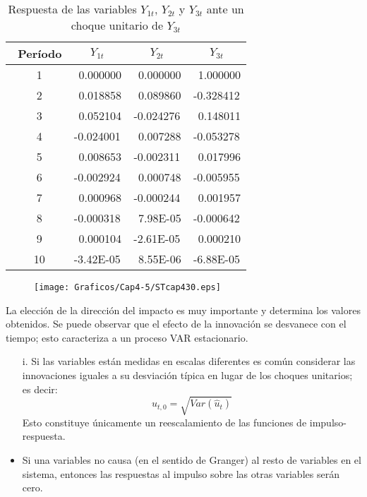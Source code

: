 \begin{table}[H]
\centering
\begin{tabular}{cccc}\hline\hline
~Per\'{i}odo & $Y_{1t}$ & $Y_{2t}$ & $Y_{3t}$ \\ \hline\hline
~1 & ~0.000000 & ~0.000000 & ~1.000000 \\
~2 & ~0.018858 & ~0.089860 & -0.328412 \\
~3 & ~0.052104 & -0.024276 & ~0.148011 \\
~4 & -0.024001 & ~0.007288 & -0.053278 \\
~5 & ~0.008653 & -0.002311 & ~0.017996 \\
~6 & -0.002924 & ~0.000748 & -0.005955 \\
~7 & ~0.000968 & -0.000244 & ~0.001957 \\
~8 & -0.000318 & ~7.98E-05 & -0.000642 \\
~9 & ~0.000104 & -2.61E-05 & ~0.000210 \\
~10& -3.42E-05 & ~8.55E-06 & -6.88E-05 \\ \hline\hline
\end{tabular}
\caption{Respuesta de las variables $Y_{1t}$, $Y_{2t}$ y $Y_{3t}$ ante un choque unitario de $Y_{3t}$}
\label{tab26}
\end{table}


\begin{figure}[H]
\centering
\texttt{[image: Graficos/Cap4-5/STcap430.eps]}
\label{fig30}
\end{figure}

La elecci\'{o}n de la direcci\'{o}n del impacto es muy importante y determina los valores obtenidos. Se puede observar que el efecto de la innovaci\'{o}n se desvanece con el tiempo; esto caracteriza a un proceso VAR estacionario.

\begin{itemize}
      \item[i.] Si las variables est\'{a}n medidas en escalas diferentes es com\'{u}n considerar las innovaciones iguales a su desviaci\'{o}n t\'{i}pica en lugar de los choques unitarios; es decir:
      \[
      \hat{u}_{t,0}=\sqrt {Var(\hat{u}_{t})} 
      \]
      Esto constituye \'{u}nicamente un reescalamiento de las funciones de impulso-respuesta.
      \item Si una variables no causa (en el sentido de Granger) al resto de variables en el sistema, entonces las respuestas al impulso sobre las otras variables ser\'{a}n cero.
\end{itemize}

